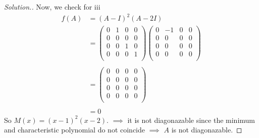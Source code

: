 \documentclass[11pt,a4paper]{article}
\theoremstyle{definition}
\newenvironment{solution}
  {\renewcommand{\qedsymbol}{}\begin{proof}[\textit{Solution}.]}
  {\end{proof}}
\begin{document}
\begin{solution}
Now, we check for iii
\begin{align*}
f(A) &=(A-I)^2(A-2I)\\
&=
\begin{pmatrix}
0&1&0&0\\0&0&0&0\\0&0&1&0\\0&0&0&1\\
\end{pmatrix}
\begin{pmatrix}
0&-1&0&0\\0&0&0&0\\0&0&0&0\\0&0&0&0\\
\end{pmatrix}\\\\
&=
\begin{pmatrix}
0&0&0&0\\0&0&0&0\\0&0&0&0\\0&0&0&0\\
\end{pmatrix}\\\\
&=0
\end{align*}
So $M(x)=(x-1)^2(x-2)$.
$\implies$ it is not diagonazable since the minimum and characteristic polynomial do not coincide $\implies$ $A$ is not diagonazable.
\end{solution}
\end{document}
